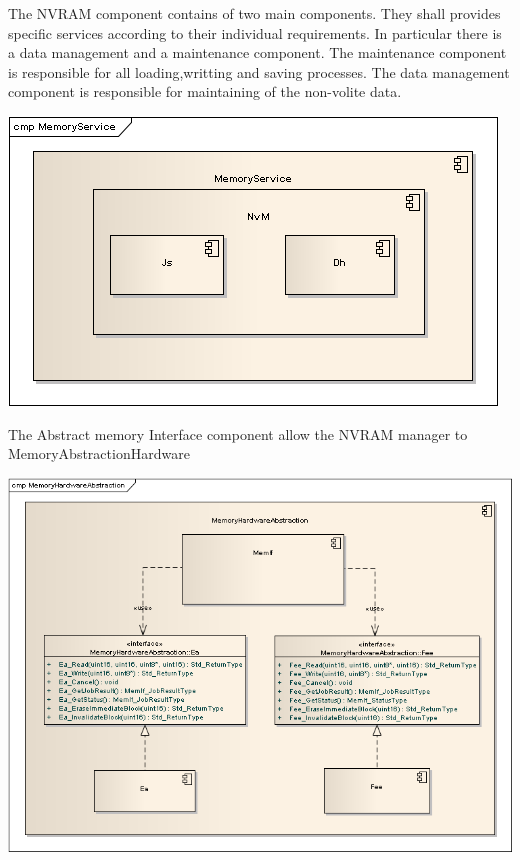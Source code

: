 The NVRAM component contains of two main components. They shall provides specific services according to their individual requirements. In particular there is a data management and a maintenance component. The maintenance component is responsible for all loading,writting and saving processes. The data management component is responsible for maintaining  of the non-volite data.
\begin{center}
\includegraphics[scale=0.7]{Images/MemoryService_Overview_UML.png}
\end{center}
The Abstract memory Interface component allow the NVRAM manager to 
\newline
MemoryAbstractionHardware
\begin{center}
\includegraphics[scale=0.55]{Images/MemoryHardwareAbstraction_Overview_UML.png}
\end{center}


